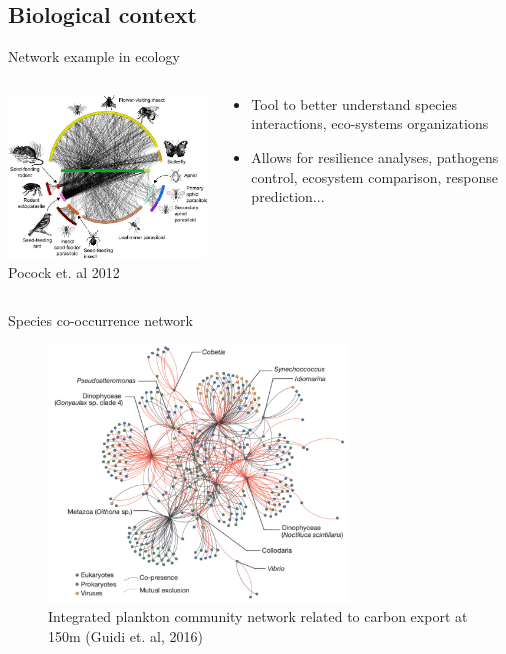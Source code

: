 \documentclass[11pt]{beamer}
\begin{document}
\subsection{Biological context}
\begin{frame}{Network example in ecology}
\begin{columns}
\begin{column}{7.5cm}
\includegraphics[width=8cm]{images/Species-interaction-networks-at-Norwood-Farm-Somerset-UK-revised-from-Pocock-et-al.png}
\footnotesize{Pocock et. al 2012}
\end{column}
\begin{column}{4.5cm}
\begin{itemize}
    \item Tool to better understand species interactions, eco-systems organizations
    \item Allows for resilience analyses, pathogens control, ecosystem comparison, response prediction...
\end{itemize}
\end{column}
\end{columns}
\end{frame}
\begin{frame}{Species co-occurrence network}
\vspace{-0.5cm}
 \begin{figure}
 \centering
 \includegraphics[width=8cm]{images/plancton.png}
\caption{\footnotesize{Integrated plankton community network related to carbon export at 150m (Guidi et. al, 2016)}}

 \end{figure}
 
\end{frame}
\end{document}

